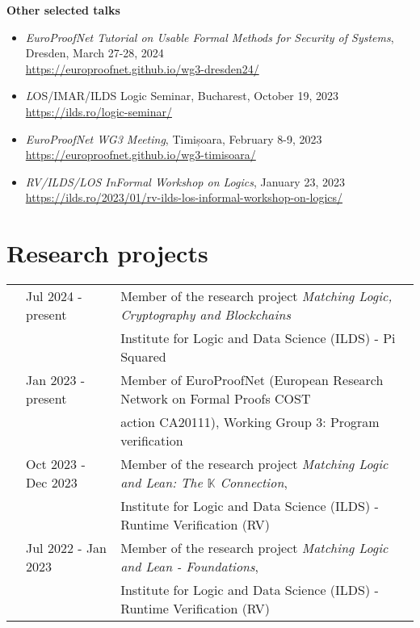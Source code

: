 \documentclass[letterpaper,11pt,oneside]{article}
\begin{document}
\noindent
\large{\textbf{Other selected talks}} 
\normalsize
\begin{itemize}
    \item \emph{EuroProofNet Tutorial on Usable Formal Methods for Security of Systems}, \\
    Dresden, March 27-28, 2024 \\ 
    \url{https://europroofnet.github.io/wg3-dresden24/}
    \item {\emph LOS/IMAR/ILDS Logic Seminar}, Bucharest, October 19, 2023 \\  
    \url{https://ilds.ro/logic-seminar/}
    \item \emph{EuroProofNet WG3 Meeting}, Timișoara, February 8-9, 2023 \\ 
    \url{https://europroofnet.github.io/wg3-timisoara/} 
    \item \emph{RV/ILDS/LOS InFormal Workshop on Logics}, 
    January 23, 2023 \\
    \url{https://ilds.ro/2023/01/rv-ilds-los-informal-workshop-on-logics/}
\end{itemize}
\mbox{} 


\noindent
\section{Research projects}
\normalsize
\begin{tabular}{@{} l l l}
    & Jul 2024 - present & Member of the research project \emph{Matching Logic, Cryptography and Blockchains} \\ 
    &                    & Institute for Logic and Data Science (ILDS) - Pi Squared \\
    & Jan 2023 - present & Member of EuroProofNet (European Research Network on Formal Proofs COST \\
    &                & action CA20111), Working Group 3: Program verification \\
    & Oct 2023 - Dec 2023 & Member of the research project \emph{Matching Logic and Lean: The $\mathbb{K}$ Connection}, \\
    &                    & Institute for Logic and Data Science (ILDS) - Runtime Verification (RV) \\
    & Jul 2022 - Jan 2023 & Member of the research project \emph{Matching Logic and Lean - Foundations}, \\
    &                     & Institute for Logic and Data Science (ILDS) - Runtime Verification (RV)
\end{tabular}
\mbox{}
\end{document}
